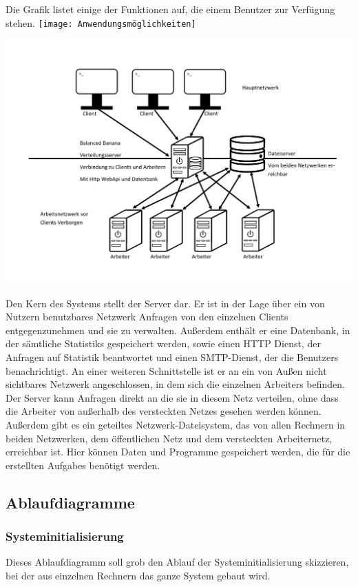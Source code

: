 \documentclass[a4paper,12pt]{article}
\begin{document}
Die Grafik listet einige der Funktionen auf, die einem \gls{Benutzer} zur Verfügung stehen.
\texttt{[image: Anwendungsmöglichkeiten]}

\includegraphics[width=\textwidth]{Systemmodelle/Systemaufbau}

Den Kern des Systems stellt der \gls{Server} dar. Er ist in der Lage über ein von Nutzern benutzbares Netzwerk Anfragen von den einzelnen \glspl{Client} entgegenzunehmen und sie zu verwalten.
Außerdem enthält er eine \gls{Datenbank}, in der sämtliche \glspl{Statistik} gespeichert werden, sowie einen HTTP Dienst, der Anfragen auf \gls{Statistik} beantwortet und einen SMTP-Dienst, der die \glspl{Benutzer} benachrichtigt. An einer weiteren \gls{Schnittstelle} ist er an ein von Außen nicht sichtbares Netzwerk angeschlossen, in dem sich die einzelnen \glspl{Arbeiter} befinden. Der \gls{Server} kann Anfragen direkt an die sie in diesem Netz verteilen, ohne dass die \gls{Arbeiter} von außerhalb des versteckten Netzes gesehen werden können. Außerdem gibt es ein geteiltes Netzwerk-Dateisystem, das von allen Rechnern in beiden Netzwerken, dem öffentlichen Netz und dem versteckten Arbeiternetz, erreichbar ist. Hier können Daten und Programme gespeichert werden, die für die erstellten \glspl{Aufgabe} benötigt werden.

\subsection{Ablaufdiagramme}
\subsubsection{Systeminitialisierung}
Dieses Ablaufdiagramm soll grob den Ablauf der Systeminitialisierung skizzieren, bei der aus einzelnen Rechnern das ganze System gebaut wird.\\
\end{document}
